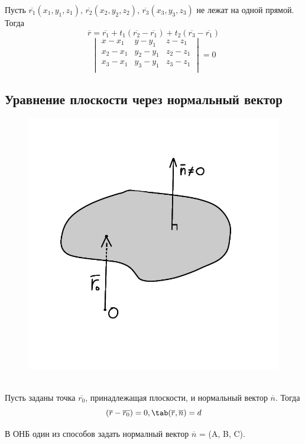 Пусть $\overline{r_1}(x_1, y_1, z_1)$, $\overline{r_2}(x_2, y_2, z_2)$, $\overline{r_3}(x_3, y_3, z_3)$ не лежат на одной прямой. Тогда
\[
\overline{r} = \overline{r_1} + t_1(\overline{r_2} - \overline{r_1}) + t_2(\overline{r_3} - \overline{r_1})
\]
\[
\begin{vmatrix}
    x - x_1 & y - y_1 & z - z_1\\
    x_2 - x_1 & y_2 - y_1 & z_2 - z_1\\
    x_3 - x_1 & y_3 - y_1 & z_3 - z_1\\
\end{vmatrix} = 0
\]
\clearpage
\subsection{Уравнение плоскости через нормальный вектор}

\begin{figure}
    \includegraphics[width=0.84\linewidth]{images/2.2.jpeg}
\end{figure}

\tab\\

Пусть заданы точка $\overline{r_0}$, принадлежащая плоскости, и нормальный вектор $\overline{n}$. Тогда
\[
(\overline{r} - \overline{r_0}) = 0, \tab (\overline{r}, \overline{n}) = d
\]

В ОНБ один из способов задать нормалный вектор $\overline{n}$ = (A, B, C).

\tab\\ \tab\\ \tab\\ \tab\\
